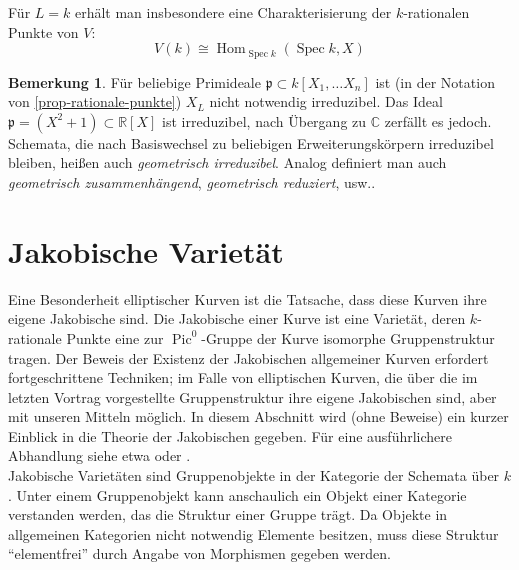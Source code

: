 \documentclass{amsart}
\theoremstyle{plain}
\theoremstyle{definition}
\newtheorem{remark}[subsection]{Bemerkung}
\newcommand{\spec}{\operatorname{Spec}}
\newcommand{\pic}{\operatorname{Pic}}
\renewcommand{\hom}{\operatorname{Hom}}
\newcommand{\idealp}{\mathfrak{p}}
\begin{document}
\noindent Für $L = k$ erhält man insbesondere eine Charakterisierung der $k$-rationalen Punkte von $V$: 
\begin{equation*}
	V(k) \cong \hom_{\spec k}(\spec k, X)
\end{equation*}

\begin{remark}
	Für beliebige Primideale $\idealp \subset k[X_1, \dots X_n]$ ist (in der Notation von \ref{prop-rationale-punkte}) $X_L$ nicht notwendig irreduzibel.
	Das Ideal $\idealp = (X^2 + 1) \subset \mathds{R}[X]$ ist irreduzibel, nach Übergang zu $\mathds{C}$ zerfällt es jedoch. \\
	Schemata, die nach Basiswechsel zu beliebigen Erweiterungskörpern irreduzibel bleiben, heißen auch {\it geometrisch irreduzibel}.
	Analog definiert man auch {\it geometrisch zusammenhängend}, {\it geometrisch reduziert}, usw..
\end{remark}

\section{Jakobische Varietät}
\label{section-jakobische-varietaet}

Eine Besonderheit elliptischer Kurven ist die Tatsache, dass diese Kurven ihre eigene Jakobische sind.
Die Jakobische einer Kurve ist eine Varietät, deren $k$-rationale Punkte eine zur $\pic^0$-Gruppe der Kurve isomorphe Gruppenstruktur tragen.
Der Beweis der Existenz der Jakobischen allgemeiner Kurven erfordert fortgeschrittene Techniken; im Falle von elliptischen Kurven, die über die im letzten Vortrag vorgestellte Gruppenstruktur ihre eigene Jakobischen sind, aber mit unseren Mitteln möglich.
In diesem Abschnitt wird (ohne Beweise) ein kurzer Einblick in die Theorie der Jakobischen gegeben.
Für eine ausführlichere Abhandlung siehe etwa \cite{hartshorne} oder \cite{liu}. \\
Jakobische Varietäten sind Gruppenobjekte in der Kategorie der Schemata über $k$.
Unter einem Gruppenobjekt kann anschaulich ein Objekt einer Kategorie verstanden werden, das die Struktur einer Gruppe trägt.
Da Objekte in allgemeinen Kategorien nicht notwendig Elemente besitzen, muss diese Struktur "`elementfrei"' durch Angabe von Morphismen gegeben werden.
\end{document}
